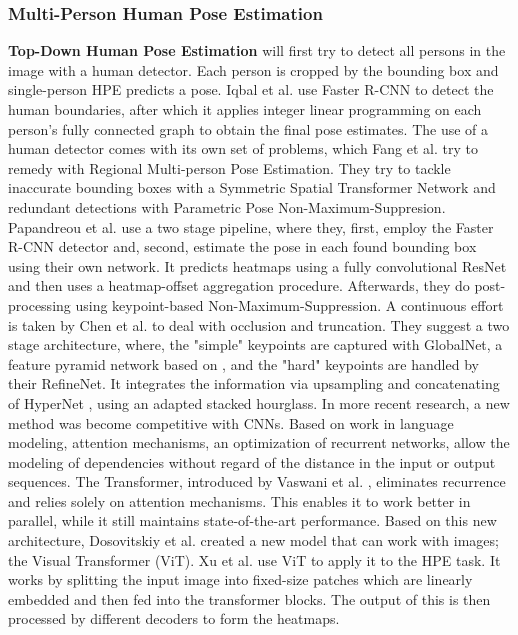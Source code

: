 \documentclass[conference]{IEEEtran}
\begin{document}
\subsubsection{Multi-Person Human Pose Estimation}
\textbf{Top-Down Human Pose Estimation} will first try to detect all persons in the image with a human detector.
Each person is cropped by the bounding box and single-person HPE predicts a pose.
Iqbal et al. \cite{Iqbal2016} use Faster R-CNN \cite{Ren2015} to detect the human boundaries, after which it applies integer linear programming on each person's fully connected graph to obtain the final pose estimates.
The use of a human detector comes with its own set of problems, which Fang et al. \cite{Fang2016} try to remedy with Regional Multi-person Pose Estimation.
They try to tackle inaccurate bounding boxes with a Symmetric Spatial Transformer Network and redundant detections with Parametric Pose Non-Maximum-Suppresion.
Papandreou et al. \cite{Papandreou2017} use a two stage pipeline, where they, first, employ the Faster R-CNN detector and, second, estimate the pose in each found bounding box using their own network.
It predicts heatmaps using a fully convolutional ResNet and then uses a heatmap-offset aggregation procedure.
Afterwards, they do post-processing using keypoint-based Non-Maximum-Suppression.
A continuous effort is taken by Chen et al. \cite{Chen2017a} to deal with occlusion and truncation.
They suggest a two stage architecture, where, the "simple" keypoints are captured with GlobalNet, a feature pyramid network based on \cite{Lin2016}, and the "hard" keypoints are handled by their RefineNet.
It integrates the information via upsampling and concatenating of HyperNet \cite{Kong2016}, using an adapted stacked hourglass.
In more recent research, a new method was become competitive with CNNs.
Based on work in language modeling, attention mechanisms, an optimization of recurrent networks, allow the modeling of dependencies without regard of the distance in the input or output sequences.
The Transformer, introduced by Vaswani et al. \cite{Vaswani2017}, eliminates recurrence and relies solely on attention mechanisms.
This enables it to work better in parallel, while it still maintains state-of-the-art performance.
Based on this new architecture, Dosovitskiy et al. \cite{Dosovitskiy2020} created a new model that can work with images; the Visual Transformer (ViT).
Xu et al. \cite{xu2022} use ViT to apply it to the HPE task.
It works by splitting the input image into fixed-size patches which are linearly embedded and then fed into the transformer blocks.
The output of this is then processed by different decoders to form the heatmaps.
\end{document}
